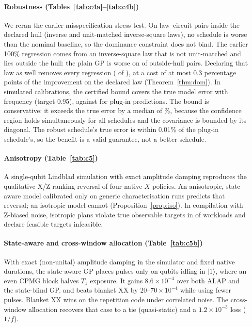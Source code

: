 \documentclass[10pt,journal]{IEEEtran}
\theoremstyle{remark}
\begin{document}
\paragraph*{Robustness (Tables~\ref{tab:c4a}--\ref{tab:c4b})}
We reran the earlier misspecification stress test. On \CFourInsideCases{} law--circuit pairs inside the declared
hull (inverse and unit-matched inverse-square laws), no schedule is worse than the nominal baseline, so the
dominance constraint does not bind. The earlier 100\% regression comes from an inverse-square law that is not
unit-matched and lies outside the hull: the plain GP is worse on \CFourPlainOutside{} of \CFourOutsideCases{}
outside-hull pairs. Declaring that law as well removes every regression (\CFourExtendedOutside{} of
\CFourOutsideCases{}), at a cost of at most 0.3 percentage points of the improvement on the declared law
(Theorem~\ref{thm:dom}). In \CFourTrials{} simulated calibrations, the certified bound covers the true model
error with frequency \CFourRobust{} (target 0.95), against \CFourPlugin{} for plug-in predictions. The bound is
conservative: it exceeds the true error by a median of \CFourSlack\%, because the confidence region holds
simultaneously for all schedules and the covariance is bounded by its diagonal. The robust schedule's true
error is within 0.01\% of the plug-in schedule's, so the benefit is a valid guarantee, not a better schedule.

\paragraph*{Anisotropy (Table~\ref{tab:c5})}
A single-qubit Lindblad simulation with exact amplitude damping reproduces the qualitative X/Z ranking reversal
of four native-$X$ policies. An anisotropic, state-aware model calibrated only on generic characterisation runs
predicts that reversal; an isotropic model cannot (Proposition~\ref{prop:iso}). In compilation with Z-biased
noise, isotropic plans violate true observable targets in \CFiveViolations{} of \CFiveCases{} workloads and
declare \CFiveFalse{} feasible targets infeasible.

\paragraph*{State-aware and cross-window allocation (Table~\ref{tab:c5b})}
With exact (non-unital) amplitude damping in the simulator and fixed native durations, the state-aware GP places
pulses only on qubits idling in $|1\rangle$, where an even CPMG block halves $T_1$ exposure. It gains
$8.6\times10^{-4}$ over both ALAP and the state-blind GP, and beats blanket XX by
$20$--$70\times10^{-4}$ while using fewer pulses. Blanket XX wins on the repetition code under correlated noise.
The cross-window allocation recovers that case to a tie (quasi-static) and a $1.2\times10^{-3}$ loss ($1/f$).
\end{document}
